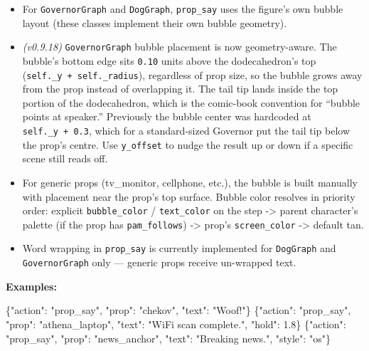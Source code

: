 \documentclass[
  12pt,
  letterpaper,
]{book}
\newenvironment{Shaded}{}{}
\newcommand{\DataTypeTok}[1]{\textcolor[rgb]{0.56,0.13,0.00}{#1}}
\newcommand{\FloatTok}[1]{\textcolor[rgb]{0.25,0.63,0.44}{#1}}
\newcommand{\FunctionTok}[1]{\textcolor[rgb]{0.02,0.16,0.49}{#1}}
\newcommand{\StringTok}[1]{\textcolor[rgb]{0.25,0.44,0.63}{#1}}
\providecommand{\tightlist}{%
  \setlength{\itemsep}{0pt}\setlength{\parskip}{0pt}}
\begin{document}
\begin{itemize}
\tightlist
\item
  For \texttt{GovernorGraph} and \texttt{DogGraph}, \texttt{prop\_say}
  uses the figure's own bubble layout (these classes implement their own
  bubble geometry).
\item
  \emph{(v0.9.18)} \texttt{GovernorGraph} bubble placement is now
  geometry-aware. The bubble's bottom edge sits \texttt{0.10} units
  above the dodecahedron's top
  (\texttt{self.\_y\ +\ self.\_radius}), regardless of prop size, so
  the bubble grows away from the prop instead of overlapping it. The
  tail tip lands inside the top portion of the dodecahedron, which
  is the comic-book convention for ``bubble points at speaker.''
  Previously the bubble center was hardcoded at \texttt{self.\_y\ +\ 0.3},
  which for a standard-sized Governor put the tail tip below the
  prop's centre. Use \texttt{y\_offset} to nudge the result up or
  down if a specific scene still reads off.
\item
  For generic props (tv\_monitor, cellphone, etc.), the bubble is built
  manually with placement near the prop's top surface. Bubble color
  resolves in priority order: explicit \texttt{bubble\_color} /
  \texttt{text\_color} on the step -\textgreater{} parent character's
  palette (if the prop has \texttt{pam\_follows}) -\textgreater{} prop's
  \texttt{screen\_color} -\textgreater{} default tan.
\item
  Word wrapping in \texttt{prop\_say} is currently implemented for
  \texttt{DogGraph} and \texttt{GovernorGraph} only --- generic props
  receive un-wrapped text.
\end{itemize}

\textbf{Examples:}

\begin{Shaded}
\begin{Highlighting}[]
\FunctionTok{\{}\DataTypeTok{"action"}\FunctionTok{:} \StringTok{"prop\_say"}\FunctionTok{,} \DataTypeTok{"prop"}\FunctionTok{:} \StringTok{"chekov"}\FunctionTok{,}  \DataTypeTok{"text"}\FunctionTok{:} \StringTok{"Woof!"}\FunctionTok{\}}
\FunctionTok{\{}\DataTypeTok{"action"}\FunctionTok{:} \StringTok{"prop\_say"}\FunctionTok{,} \DataTypeTok{"prop"}\FunctionTok{:} \StringTok{"athena\_laptop"}\FunctionTok{,}
 \DataTypeTok{"text"}\FunctionTok{:} \StringTok{"WiFi scan complete."}\FunctionTok{,} \DataTypeTok{"hold"}\FunctionTok{:} \FloatTok{1.8}\FunctionTok{\}}
\FunctionTok{\{}\DataTypeTok{"action"}\FunctionTok{:} \StringTok{"prop\_say"}\FunctionTok{,} \DataTypeTok{"prop"}\FunctionTok{:} \StringTok{"news\_anchor"}\FunctionTok{,} \DataTypeTok{"text"}\FunctionTok{:} \StringTok{"Breaking news."}\FunctionTok{,}
 \DataTypeTok{"style"}\FunctionTok{:} \StringTok{"os"}\FunctionTok{\}}
\end{Highlighting}
\end{Shaded}
\end{document}
